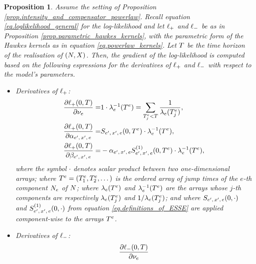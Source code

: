 \documentclass[10pt, article,table]{article}
\newtheorem{prop}[thm]{Proposition}
\begin{document}
\begin{prop}
 Assume the setting of Proposition \ref{prop.intensity_and_compensator_powerlaw}. Recall equation \eqref{eq.loglikelihood_general} for the log-likelihood and let $\lplus$ and $\lminus$ be as in Proposition \ref{prop.parametric_hawkes_kernels}, with the parametric form of the Hawkes kernels as in equation \eqref{eq.powerlaw_kernels}. Let $\timeHorizon$ be the time horizon of the realisation of $(\multiCountingProc, \stateVariable)$. 
 Then, the gradient of the log-likelihood is computed based on the following espressions for the derivatives of $\lplus$ and $\lminus$ with respect to the model's parameters.
 \begin{itemize}
  \item Derivatives of $\lplus$:
  \begin{equation}\label{eq.derivatives_of_lplus}
  \begin{split}
   \frac{\partial\lplus(0,\timeHorizon)}{\partial\baseRate_e}
   =&
   1 \cdot \intensity[e]\inverse(\arrivalTimes[e])
   = \sum_{\arrivalTimes[e]_j < \timeHorizon}\frac{1}{\intensity[e](\arrivalTimes[e]_j)},
   \\
   \frac{\partial\lplus(0,\timeHorizon)}{\partial\impCoef\subscriptexe}
   =&
   \ESSE\subscriptexe(0,\arrivalTimes[e])\cdot \intensity[e]\inverse(\arrivalTimes[e]),
   \\
   \frac{\partial\lplus(0,\timeHorizon)}{\partial\decCoef\subscriptexe}
   =&
   -\impCoef\subscriptexe
   \ESSEone\subscriptexe(0,\arrivalTimes[e])\cdot \intensity[e]\inverse(\arrivalTimes[e]),
  \end{split}
 \end{equation}
 where the symbol $\cdot$ denotes scalar product between two one-dimensional arrays; where $\arrivalTimes[e] = (\arrivalTimes[e]_1, \arrivalTimes[e]_2, \dots )$ is the ordered array of jump times of the $e$-th component $\countingProc$ of $\multiCountingProc$;  where $\intensity[e](\arrivalTimes[e])$ and $\intensity[e]\inverse(\arrivalTimes[e])$ are the arrays whose $j$-th components are respectively $\intensity[e](\arrivalTimes[e]_j)$ and $1/\intensity[e](\arrivalTimes[e]_j)$; and where $\ESSE\subscriptexe(0,\cdot)$ and $\ESSEone\subscriptexe(0,\cdot)$ from equation \eqref{eq.definitions_of_ESSE} are applied component-wise to the arrays $\arrivalTimes[e]$.
 \item Derivatives of $\lminus$:
 \begin{equation}\label{eq.derivatives_of_lminus}
  \begin{split}
   \frac{\partial\lminus(0,\timeHorizon)}{\partial\baseRate_e}

\end{split}
\end{equation}
\end{itemize}
\end{prop}
\end{document}
